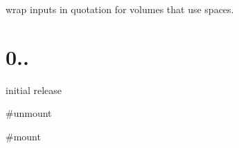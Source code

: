 
\begin{DoxyItemize}
\item wrap inputs in quotation for volumes that use spaces.
\end{DoxyItemize}

\section*{0..}


\begin{DoxyItemize}
\item initial release
\item \#unmount
\item \#mount 
\end{DoxyItemize}